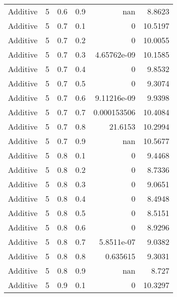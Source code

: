 \documentclass{article}
\begin{document}
\begin{longtable}[H]{lrrrrr}
 Additive       &       5 &   0.6 &            0.9 &    nan           &          8.8623 \\
 Additive       &       5 &   0.7 &            0.1 &      0           &         10.5197 \\
 Additive       &       5 &   0.7 &            0.2 &      0           &         10.0055 \\
 Additive       &       5 &   0.7 &            0.3 &      4.65762e-09 &         10.1585 \\
 Additive       &       5 &   0.7 &            0.4 &      0           &          9.8532 \\
 Additive       &       5 &   0.7 &            0.5 &      0           &          9.3074 \\
 Additive       &       5 &   0.7 &            0.6 &      9.11216e-09 &          9.9398 \\
 Additive       &       5 &   0.7 &            0.7 &      0.000153506 &         10.4084 \\
 Additive       &       5 &   0.7 &            0.8 &     21.6153      &         10.2994 \\
 Additive       &       5 &   0.7 &            0.9 &    nan           &         10.5677 \\
 Additive       &       5 &   0.8 &            0.1 &      0           &          9.4468 \\
 Additive       &       5 &   0.8 &            0.2 &      0           &          8.7336 \\
 Additive       &       5 &   0.8 &            0.3 &      0           &          9.0651 \\
 Additive       &       5 &   0.8 &            0.4 &      0           &          8.4948 \\
 Additive       &       5 &   0.8 &            0.5 &      0           &          8.5151 \\
 Additive       &       5 &   0.8 &            0.6 &      0           &          8.9296 \\
 Additive       &       5 &   0.8 &            0.7 &      5.8511e-07  &          9.0382 \\
 Additive       &       5 &   0.8 &            0.8 &      0.635615    &          9.3031 \\
 Additive       &       5 &   0.8 &            0.9 &    nan           &          8.727  \\
 Additive       &       5 &   0.9 &            0.1 &      0           &         10.3297 \\

\end{longtable}
\end{document}
